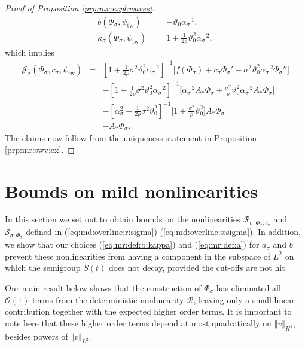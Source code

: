 \documentclass[10pt]{articleHJ}
\renewcommand{\O}{\ensuremath{\mathcal{O}}}
\newcommand{\norm}[1]{\left\Vert#1\right\Vert}		%
\newcommand{\sref}[1]{(\ref{#1})}                       %
\numberwithin{equation}{section}
\begin{document}
\begin{proof}[Proof of Proposition \ref{prp:mr:expl:waves}]
\begin{equation}
\begin{array}{lcl}
b(\Phi_{\sigma}, \psi_{\mathrm{tw}})
  & = & - \vartheta_0 \alpha_{\sigma}^{-1},
\\[0.2cm]
\kappa_{\sigma}(\Phi_{\sigma}, \psi_{\mathrm{tw}} )
 & = & 1 + \frac{1}{2 \rho} \vartheta_{0}^2 \alpha_{\sigma}^{-2},
\end{array}
\end{equation}
which implies
\begin{equation}
\begin{array}{lcl}
\mathcal{J}_{\sigma}(\Phi_{\sigma}, c_{\sigma}, \psi_{\mathrm{tw}})
& = &
 [1 + \frac{1}{2\rho} \sigma^2 \vartheta_{0}^2 \alpha_{\sigma}^{-2} ]^{-1}
\big[ f( \Phi_{\sigma} ) + c_{\sigma} \Phi_{\sigma}'
  - \sigma^2 \vartheta_{0}^2 \alpha_{\sigma}^{-2}
      \Phi_{\sigma}'' \big]
\\[0.2cm]
& = &
-[1 + \frac{1}{2\rho} \sigma^2 \vartheta_{0}^2 \alpha_{\sigma}^{-2} ]^{-1}
\big[  \alpha_{\sigma}^{-2} A_* \Phi_\sigma
+ \frac{\sigma^2}{\rho} \vartheta_{0}^2 \alpha_{\sigma}^{-2}
      A_* \Phi_{\sigma} \big]
\\[0.2cm]
& = &
-[\alpha_{\sigma}^2
+ \frac{1}{2\rho} \sigma^2 \vartheta_{0}^2
]^{-1}
\big[  1 + \frac{\sigma^2}{\rho} \vartheta_0^2 \big]
   A_* \Phi_\sigma
\\[0.2cm]
& = & - A_* \Phi_{\sigma}.
\end{array}
\end{equation}
The claims now follow from the uniqueness
statement in Proposition \ref{prp:mr:swv:ex}.
\end{proof}


\section{Bounds on mild nonlinearities}
\label{sec:fnl}

In this section we set out to
obtain bounds on the
nonlinearities
$\overline{\mathcal{R}}_{\sigma;
 \Phi_{\sigma}, c_{\sigma}}$ and
 $\overline{\mathcal{S}}_{\sigma;\Phi_{\sigma}}$
defined in \sref{eq:md:overline:r:sigma}-\sref{eq:md:overline:s:sigma}.
In addition, we show that our choices
\sref{eq:mr:def:b:kappa} and \sref{eq:mr:def:a}
for $a_{\sigma}$ and $b$
prevent these nonlinearities from having
a component in the subspace of $L^2$
on which the semigroup $S(t)$ does not decay,
provided the cut-offs are not hit.

Our main result below shows that
the construction of $\Phi_{\sigma}$
has eliminated all $\O(1)$-terms
from the deterministic nonlinearity
$\overline{\mathcal{R}}$, leaving only
a small linear contribution together with the
expected higher order terms.
It is important to note here
that these higher order terms
depend at most quadratically on $\norm{v}_{H^1}$,
besides powers of $\norm{v}_{L^2}$.
\end{document}

